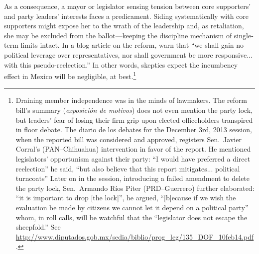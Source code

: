 \documentclass[letter,12pt]{article}
\begin{document}
As a consequence, a mayor or legislator sensing tension between core supporters' and party leaders' interests faces a predicament. Siding systematically with core supporters might expose her to the wrath of the leadership and, as retaliation, she may be excluded from the ballot---keeping the discipline mechanism of single-term limits \citep{weldon.1997} intact. In a blog article on the reform, \citet{merinoFierroZarkin2013Blog} warn that ``we shall gain no political leverage over representatives, nor shall government be more responsive... with this pseudo-reelection.'' In other words, skeptics expect the incumbency effect in Mexico will be negligible, at best.\footnote{Draining member independence was in the minds of lawmakers. The reform bill's summary (\emph{exposición de motivos}) does not even mention the party lock, but leaders' fear of losing their firm grip upon elected officeholders transpired in floor debate. The diario de los debates for the December 3rd, 2013 session, when the reported bill was considered and approved, registers Sen.\ Javier Corral's (PAN--Chihuahua) intervention in favor of the report. He mentioned legislators' opportunism against their party: ``I would have preferred a direct reelection'' he said, ``but also believe that this report mitigates... political turncoats'' Later on in the session, introducing a failed amendment to delete the party lock, Sen.\ Armando Ríos Piter (PRD--Guerrero) further elaborated: ``it is important to drop [the lock]'', he argued, ``[b]ecause if we wish the evaluation be made by citizens we cannot let it depend on a political party'' whom, in roll calls, will be watchful that the ``legislator does not escape the sheepfold.'' See \url{http://www.diputados.gob.mx/sedia/biblio/prog_leg/135_DOF_10feb14.pdf}.}



\end{document}
